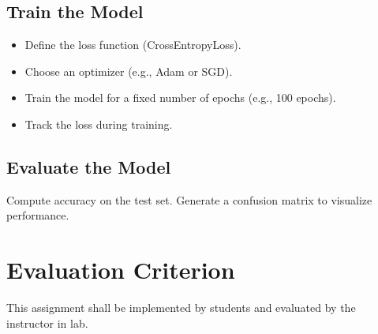 \documentclass[11pt]{article}
\begin{document}
\subsection{Train the Model}
\label{sec:orgc641951}
\begin{itemize}
\item Define the loss function (CrossEntropyLoss).
\item Choose an optimizer (e.g., Adam or SGD).
\item Train the model for a fixed number of epochs (e.g.,
100 epochs).
\item Track the loss during training.
\end{itemize}
\subsection{Evaluate the Model}
\label{sec:org58d5b0e}
Compute accuracy on the test set.  Generate a confusion
matrix to visualize performance.

\section{Evaluation Criterion}
\label{sec:orgbf5dea9}

This assignment shall be implemented by students and
evaluated by the instructor in lab.
\end{document}
